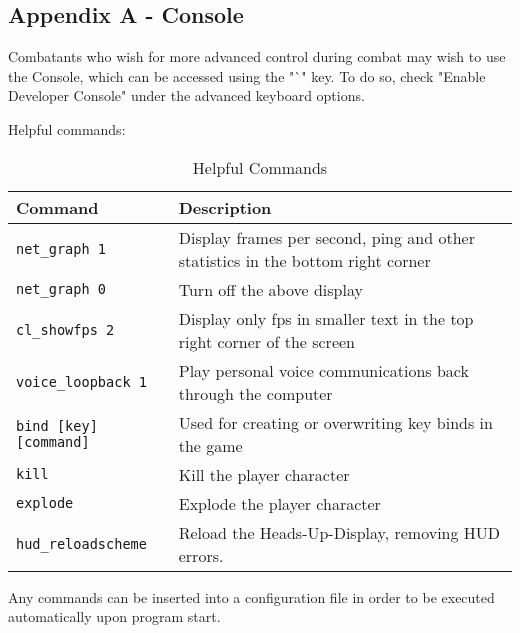 \subsection{Appendix A - Console}
Combatants who wish for more advanced control during combat may wish to use the Console, which can be accessed using the "`" key. To do so, check "Enable Developer Console" under the advanced keyboard options.

Helpful commands:
\begin{table}[h!b!p!]
\caption{Helpful Commands}
\begin{tabular}{|l|p{10.5cm}|}
	\hline
		Command & Description\\
	\hline
	\texttt{net\_graph 1}&Display frames per second, ping and other statistics in the bottom right corner\\
	\texttt{net\_graph 0}&Turn off the above display\\
	\texttt{cl\_showfps 2}&Display only fps in smaller text in the top right corner of the screen\\
	\texttt{voice\_loopback 1}&Play personal voice communications back through the computer\\
	\texttt{bind [key] [command]}&Used for creating or overwriting key binds in the game\\
	\texttt{kill}&Kill the player character\\
	\texttt{explode}&Explode the player character\\
	\texttt{hud\_reloadscheme}&Reload the Heads-Up-Display, removing HUD errors.\\
  	\hline
\end{tabular}
\label{table_common_actions}
\end{table}


Any commands can be inserted into a configuration file in order to be executed automatically upon program start.